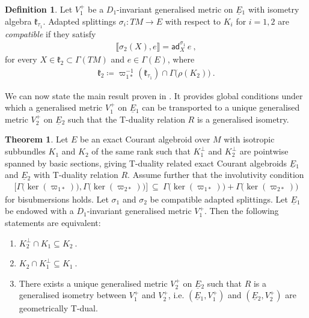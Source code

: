 \documentclass[a4paper, reqno, 11pt]{amsart}
\numberwithin{equation}{section}
\theoremstyle{definition}
\newtheorem{definition}[equation]{Definition}
\newtheorem{theorem}[equation]{Theorem}
\newcommand{\red}[1]{\underline{#1}}
\newcommand{\frk}[1]{\mathfrak{#1}}
\newcommand{\sfGamma}{{\mathsf{\Gamma}}}
\newcommand{\ad}{\mathsf{ad}}
\theoremstyle{remark}
\begin{document}
\begin{definition} \label{def:compatiblesplit}
    Let $V_1^+$ be a $D_1$-invariant generalised metric on $\red E{}_1$ with isometry algebra $\frk{k}_{\tau_1}$. Adapted splittings $\sigma_i:TM\to E$ with respect to $K_i$ for $i=1,2$ are \emph{compatible} if they satisfy
    \begin{align} \label{eqn:compatiblesplits}
        \llbracket \sigma_2  (X) , e \rrbracket = \ad^{\sigma_1}_X\, e \ ,
    \end{align}
    for every $X \in  \frk{k}_2\subset\sfGamma(TM)$ and $e\in \mathsf{\Gamma}(E)$, where
    \begin{align}
       \frk{k}_2 \coloneqq \varpi_{1*}^{-1}(\frk{k}_{\tau_1}) \cap \mathsf{\Gamma}\big(\rho(K_2)\big) \ .
    \end{align}
\end{definition}

We can now state the main result proven in \cite{DeFraja:2023fhe}. It provides global conditions under which a generalised metric $V_1^+$ on $\red E{}_1$ can be transported to a unique generalised metric $V_2^+$ on $\red E{}_2$ such that the T-duality relation $R$ is a generalised isometry.

\begin{theorem}\label{thm:maingeneral}
    Let $E$ be an exact Courant algebroid over $M$ with isotropic subbundles $K_1$ and $K_2$ of the same rank such that $K_1^\perp$ and $K_2^\perp$ are pointwise spanned by basic sections, giving T-duality related exact Courant algebroids $\red E{}_1$ and $\red E{}_2$ with T-duality relation $R$. Assume further that the involutivity condition
    \begin{align} \label{eqn:bisubmersioncd}
\big[\mathsf{\Gamma}\bigl(\ker(\varpi_{1*})\bigr) , \mathsf{\Gamma}\big(\ker(\varpi_{2*})\big)\big] \ \subseteq  \ \mathsf{\Gamma}\bigl(\ker(\varpi_{1*})\bigr) + \mathsf{\Gamma}\bigl(\ker(\varpi_{2*})\bigr)
\end{align}
    for bisubmersions holds. Let  $\sigma_1$ and $\sigma_2$ be compatible adapted splittings.  Let $\red E{}_1$ be endowed with a $D_1$-invariant generalised metric $V_1^+$. 
    Then the following statements are equivalent:
    \begin{enumerate}[label = (\roman{enumi})]
        \item\label{item:main1} $K_2^\perp \cap K_1 \subseteq K_2 \ . $ \\[-3mm]
        \item\label{item:main2} $K_2 \cap K_1^\perp \subseteq K_1 \ . $ \\[-3mm]
        \item\label{item:main3} There exists a unique generalised metric $V_2^+$ on $\red E{}_2$ such that $R$ is a generalised isometry between $V_1^+$ and $V_2^+$, i.e. $(\red E{}_1, V_1^+)$ and $(\red E{}_2, V_2^+)$ are geometrically T-dual.
    \end{enumerate}
\end{theorem}
\end{document}
